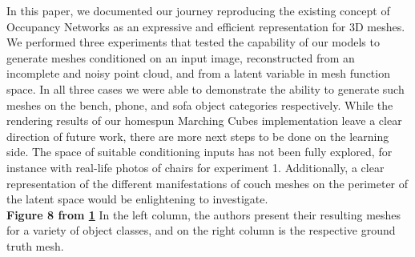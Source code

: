 \documentclass[11pt]{article}
\begin{document}
In this paper, we documented our journey reproducing the existing concept of Occupancy Networks as an expressive and efficient representation for 3D meshes. We performed three experiments that tested the capability of our models to generate meshes conditioned on an input image, reconstructed from an incomplete and noisy point cloud, and from a latent variable in mesh function space. In all three cases we were able to demonstrate the ability to generate such meshes on the bench, phone, and sofa object categories respectively. While the rendering results of our homespun Marching Cubes implementation leave a clear direction of future work, there are more next steps to be done on the learning side. The space of suitable conditioning inputs has not been fully explored, for instance with real-life photos of chairs for experiment 1. Additionally, a clear representation of the different manifestations of couch meshes on the perimeter of the latent space would be enlightening to investigate. \\

\textbf{Figure 8 from \hyperlink{ref1}{1}} In the left column, the authors present their resulting meshes for a variety of object classes, and on the right column is the respective ground truth mesh.

\clearpage
\end{document}
